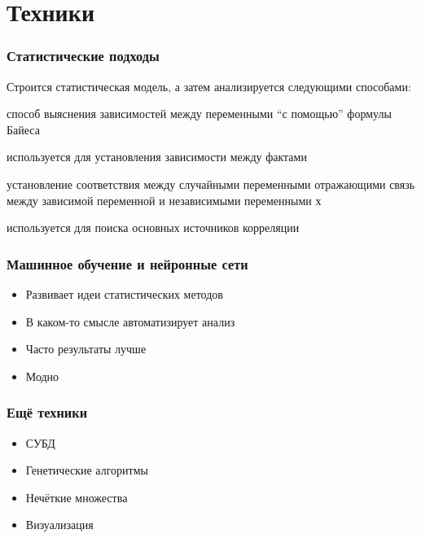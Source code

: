 \section{Техники}

\begin{frame}
    \frametitle{Статистические подходы}

    Строится статистическая модель, а затем анализируется следующими способами:

    \begin{description}
        \item[Байесовские сети] способ выяснения зависимостей между переменными \enquote{с помощью} формулы Байеса
        \item[Корреляция] используется для установления зависимости между фактами
        \item[Регрессия] установление соответствия между случайными переменными отражающими связь между зависимой переменной и независимыми переменными х
        \item[Факторный анализ] используется для поиска основных источников корреляции
    \end{description}

\end{frame}

\begin{frame}
    \frametitle{Машинное обучение и нейронные сети}

    \begin{itemize}
        \item Развивает идеи статистических методов
        \item В каком-то смысле автоматизирует анализ
        \item Часто результаты лучше
        \item Модно
    \end{itemize}

\end{frame}

\begin{frame}
    \frametitle{Ещё техники}

    \begin{itemize}
        \item СУБД
        \item Генетические алгоритмы
        \item Нечёткие множества
        \item Визуализация
    \end{itemize}

\end{frame}

